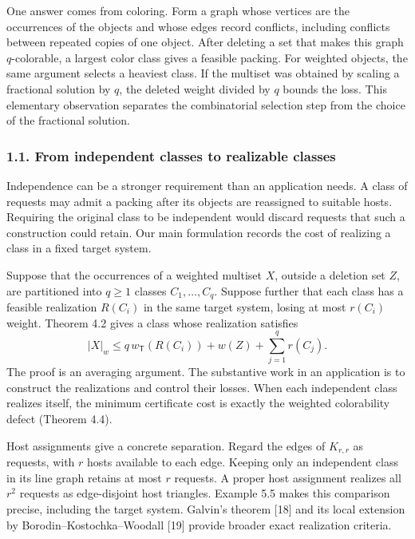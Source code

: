 \documentclass[english,11pt,a4paper]{article}
\begin{document}
One answer comes from coloring. Form a graph whose vertices are the
occurrences of the objects and whose edges record conflicts, including
conflicts between repeated copies of one object. After deleting a set
that makes this graph \(q\)-colorable, a largest color class gives a
feasible packing. For weighted objects, the same argument selects a
heaviest class. If the multiset was obtained by scaling a fractional
solution by \(q\), the deleted weight divided by \(q\) bounds the loss.
This elementary observation separates the combinatorial selection step
from the choice of the fractional solution.

\subsubsection{1.1. From independent classes to realizable
classes}\label{from-independent-classes-to-realizable-classes}

Independence can be a stronger requirement than an application needs. A
class of requests may admit a packing after its objects are reassigned
to suitable hosts. Requiring the original class to be independent would
discard requests that such a construction could retain. Our main
formulation records the cost of realizing a class in a fixed target
system.

Suppose that the occurrences of a weighted multiset \(X\), outside a
deletion set \(Z\), are partitioned into \(q\ge1\) classes
\(C_1,\ldots,C_q\). Suppose further that each class has a feasible
realization \(R(C_i)\) in the same target system, losing at most
\(r(C_i)\) weight. Theorem 4.2 gives a class whose realization satisfies
\[
|X|_w\le q\,w_{\mathsf T}(R(C_i))+w(Z)+\sum_{j=1}^q r(C_j).
\] The proof is an averaging argument. The substantive work in an
application is to construct the realizations and control their losses.
When each independent class realizes itself, the minimum certificate
cost is exactly the weighted colorability defect (Theorem 4.4).

Host assignments give a concrete separation. Regard the edges of
\(K_{r,r}\) as requests, with \(r\) hosts available to each edge.
Keeping only an independent class in its line graph retains at most
\(r\) requests. A proper host assignment realizes all \(r^2\) requests
as edge-disjoint host triangles. Example 5.5 makes this comparison
precise, including the target system. Galvin's theorem {[}18{]} and its
local extension by Borodin--Kostochka--Woodall {[}19{]} provide broader
exact realization criteria.
\end{document}
